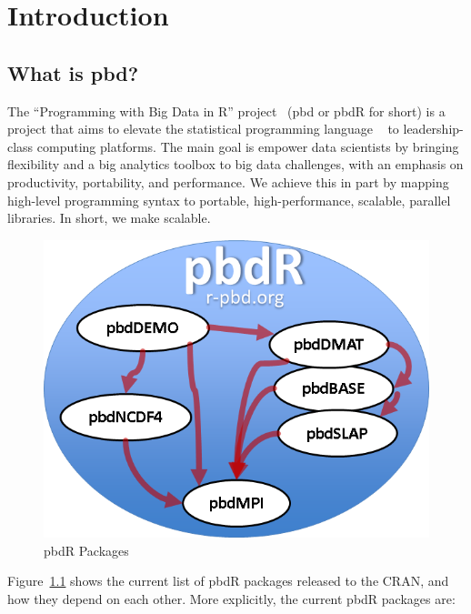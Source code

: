 \chapter[Introduction]{Introduction}
\label{sec:introduction}


\section{What is pbd?}

The ``Programming with Big Data in R'' project~\citep{pbdR2012} (pbd or pbdR for short) is a project that aims to elevate the statistical programming language ~\citep{Rcore} to leadership-class computing platforms.  The main goal is empower data scientists by bringing flexibility and a big analytics toolbox to big data challenges, with an emphasis on productivity, portability, and performance.  We achieve this in part by mapping high-level programming syntax to portable, high-performance, scalable, parallel libraries.  In short, we make  scalable.

\begin{figure}[h]
 \centering
 \includegraphics[scale=.65]{pbdDEMO-include/pics/pbdR.png}
 \caption{pbdR Packages}
 \label{fig:pbdrpackages}
\end{figure}

Figure~\ref{fig:pbdrpackages} shows the current list of pbdR packages released to the CRAN, and how they depend on each other.  More explicitly, the current pbdR packages are:


